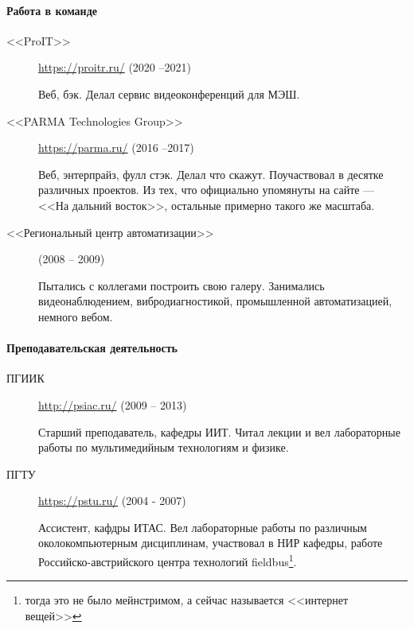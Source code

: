 \documentclass [a4paper,10pt]{article}
\begin{document}
\paragraph{Работа в команде}
\begin{description}
\item[<<ProIT>>] \url{https://proitr.ru/} (2020 --2021)
	
Веб, бэк. Делал сервис видеоконференций для МЭШ.

\item[<<PARMA Technologies Group>>] \url{https://parma.ru/} (2016 --2017)
	
Веб, энтерпрайз, фулл стэк. Делал что скажут. Поучаствовал в десятке различных проектов.
Из тех, что официально упомянуты на сайте --- <<На дальний восток>>, остальные примерно такого же масштаба.

\item[<<Региональный центр автоматизации>>] (2008 -- 2009)

Пытались с коллегами построить свою галеру. Занимались видеонаблюдением, вибродиагностикой, промышленной автоматизацией, немного вебом.
\end{description}

\paragraph{Преподавательская деятельность}
\begin{description}
\item[ПГИИК] \url{http://psiac.ru/} (2009 -- 2013)

Старший преподаватель, кафедры ИИТ. Читал лекции и вел лабораторные работы по мультимедийным технологиям и физике.

\item[ПГТУ] \url{https://pstu.ru/} (2004 - 2007)

Ассистент, кафдры ИТАС. Вел лабораторные работы по различным околокомпьютерным дисциплинам,
участвовал в НИР кафедры, работе Российско-австрийского центра технологий fieldbus\footnote{тогда это не было мейнстримом, а сейчас называется <<интернет вещей>>}.
\end{description}
\end{document}
